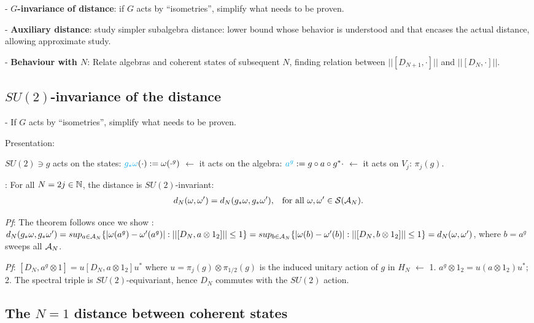 - \textbf{$G$-invariance of distance}: if $G$ acts by ``isometries'', simplify what needs to be proven.

- \textbf{Auxiliary distance}: study simpler subalgebra distance: lower bound whose behavior is understood and that encases the actual distance, allowing approximate study.

- \textbf{Behaviour with $N$}: Relate algebras and coherent states of subsequent $N$, finding relation between $||[D_{N+1}, \cdot]||$ and $||[D_N, \cdot]||$.

\linea

\subsection{$SU(2)$-invariance of the distance}

 - If $G$ acts by ``isometries'', simplify what needs to be proven.

Presentation:

$SU(2) \ni g$ acts on the states: $\textcolor{cyan}{g_*\omega}(\cdot) := \omega(\cdot^g)$ $\longleftarrow$ it acts on the algebra: $\textcolor{cyan}{a^g}:= g\circ a \circ g^* \cdot$ $\longleftarrow$ it acts on $V_j$: $\pi_j(g)$.

\textbf{}: For all $N = 2j \in \mathbb{N}$, the distance is $SU(2)$-invariant: 
\begin{align}
    d_N(\omega, \omega') &= d_N(g_* \omega, g_*\omega'), & \text{for all $\omega, \omega' \in \mathcal S(\mathcal A_N)$}.
\end{align}

\textit{Pf}: The theorem follows once we show 
    \rtext{$||[D_N, a^g]|| = ||[D_N, a]||$}:
$d_N(g_* \omega, g_* \omega') = sup_{a \in \mathcal A_N}\{ |\omega(a^g) - \omega'(a^g)|: ||[D_N, a \otimes 1_2]|| \leq 1 \} = sup_{b \in \mathcal A_N}\{ |\omega(b) - \omega'(b)|: ||[D_N, b \otimes 1_2]|| \leq 1 \} = d_N(\omega, \omega')$, where $b = a^g$ sweeps all $\mathcal A_N$.

\textit{Pf}: $[D_N, a^g \otimes 1] = u[D_N, a \otimes 1_2]u^*$ where $u = \pi_j(g) \otimes \pi_{1/2}(g)$ is the induced unitary action of $g$ in $H_N$ $\xleftarrow{}$
1. $a^g \otimes 1_2 = u(a \otimes 1_2)u^*$;
2. The spectral triple is $SU(2)$-equivariant, hence $D_N$ commutes with the $SU(2)$ action.

\subsection{The $N=1$ distance between coherent states}


